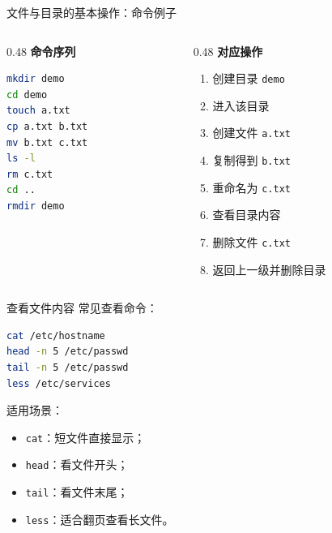 \documentclass[aspectratio=169]{beamer}
\begin{document}
\begin{frame}[fragile]{文件与目录的基本操作：命令例子}
\begin{columns}[T]

\begin{column}{0.48\textwidth}
\textbf{命令序列}
\begin{lstlisting}[language=bash]
mkdir demo
cd demo
touch a.txt
cp a.txt b.txt
mv b.txt c.txt
ls -l
rm c.txt
cd ..
rmdir demo
\end{lstlisting}
\end{column}

\begin{column}{0.48\textwidth}
\textbf{对应操作}
\begin{enumerate}
  \item 创建目录 \texttt{demo}
  \item 进入该目录
  \item 创建文件 \texttt{a.txt}
  \item 复制得到 \texttt{b.txt}
  \item 重命名为 \texttt{c.txt}
  \item 查看目录内容
  \item 删除文件 \texttt{c.txt}
  \item 返回上一级并删除目录
\end{enumerate}
\end{column}

\end{columns}
\end{frame}
\begin{frame}[fragile]{查看文件内容}
常见查看命令：
\begin{lstlisting}[language=bash]
cat /etc/hostname
head -n 5 /etc/passwd
tail -n 5 /etc/passwd
less /etc/services
\end{lstlisting}

\vspace{0.5em}
适用场景：
\begin{itemize}
  \item \texttt{cat}：短文件直接显示；
  \item \texttt{head}：看文件开头；
  \item \texttt{tail}：看文件末尾；
  \item \texttt{less}：适合翻页查看长文件。
\end{itemize}
\end{frame}
\end{document}

